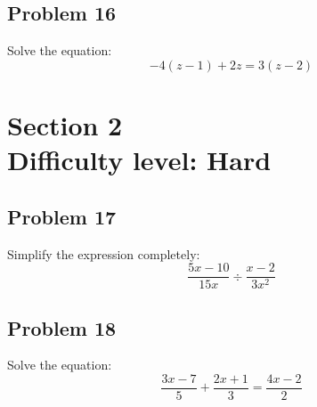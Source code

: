 \documentclass[12pt]{article}
\begin{document}
\subsection*{Problem 16}
Solve the equation:  
\[
-4(z - 1) + 2z = 3(z - 2)
\]


\section*{Section 2\\ Difficulty level: Hard}
\subsection*{Problem 17}
Simplify the expression completely:
\[
\dfrac{5x - 10}{15x} \div \dfrac{x - 2}{3x^2}
\]

\subsection*{Problem 18}
Solve the equation:  
\[
\dfrac{3x - 7}{5} + \dfrac{2x + 1}{3} = \dfrac{4x - 2}{2}
\]
\end{document}
